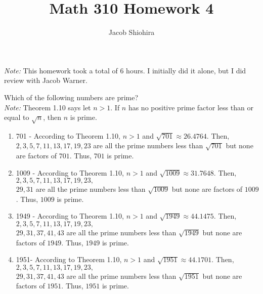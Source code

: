 \documentclass[12pt]{article}
\newenvironment{problem}[2][Problem]{\begin{trivlist}
\item[\hskip \labelsep {\bfseries #1}\hskip \labelsep {\bfseries #2.}]}{\end{trivlist}}
\begin{document}
 
\title{Math 310 Homework 4}
\author{Jacob Shiohira}
\maketitle

\noindent
\textit{Note:} This homework took a total of 6 hours. I initially did it alone, but I did review with Jacob Warner.

\begin{problem}{1}
Which of the following numbers are prime? \\

\noindent
\textit{Note:} Theorem 1.10 says let $n > 1$. If $n$ has no positive prime factor less than or equal to $\sqrt{n}$, then $n$ is prime.

\begin{center}
\begin{enumerate}[label=(\alph*)]
\item 701 - According to Theorem 1.10, $n > 1$ and $\sqrt{701} \approx 26.4764$. Then, $2,3,5,7,11,13,17,19,23$ are all the prime numbers less than $\sqrt{701}$ but none are factors of $701$. Thus, $701$ is prime. 

\item 1009 - According to Theorem 1.10, $n > 1$ and $\sqrt{1009} \approx 31.7648$. Then, $2,3,5,7,11,13,17,19,23,$ \\
$29,31$ are all the prime numbers less than $\sqrt{1009}$ but none are factors of $1009$. Thus, $1009$ is prime. 

\item 1949 - According to Theorem 1.10, $n > 1$ and $\sqrt{1949} \approx 44.1475$. Then, $2,3,5,7,11,13,17,19,23,$ \\
$29,31,37,41,43$ are all the prime numbers less than $\sqrt{1949}$ but none are factors of $1949$. Thus, $1949$ is prime. 

\item 1951- According to Theorem 1.10, $n > 1$ and $\sqrt{1951} \approx 44.1701$. Then, $2,3,5,7,11,13,17,19,23,$ \\
$29,31,37,41,43$ are all the prime numbers less than $\sqrt{1951}$ but none are factors of $1951$. Thus, $1951$ is prime. 

\end{enumerate}
\end{center}
\end{problem}
\end{document}

